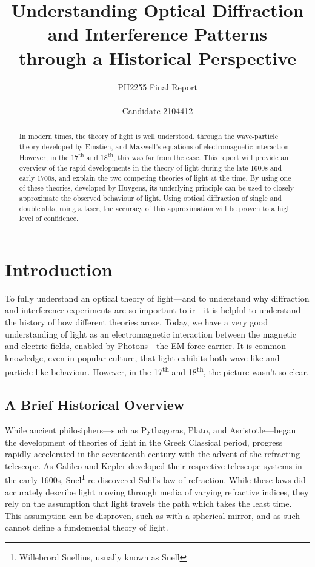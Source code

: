 \documentclass[a4paper]{article}
\title{%
  Understanding Optical Diffraction and Interference Patterns \\through a Historical Perspective}
\author{PH2255 Final Report\\ \\Candidate 2104412}
\begin{document}
\maketitle
\bigbreak
\bigbreak
{
\begin{changemargin}{1.5cm}{1.5cm} 
\begin{abstract}
{In modern times, the theory of light is well understood, through the wave-particle theory developed by Einstien, and Maxwell's equations of electromagnetic interaction. However, in the 17\textsuperscript{th} and 18\textsuperscript{th}, this was far from the case. This report will provide an overview of the rapid developments in the theory of light during the late 1600s and early 1700s, and explain the two competing theories of light at the time. By using one of these theories, developed by Huygens, its underlying principle can be used to closely approximate the observed behaviour of light. Using optical diffraction of single and double slits, using a laser, the accuracy of this approximation will be proven to a high level of confidence.}
\end{abstract}
\end{changemargin}
}
\tableofcontents
\clearpage
\section{Introduction} \label{sec:intro}
To fully understand an optical theory of light---and to understand why diffraction and interference experiments are so important to ir---it is helpful to understand the history of how different theories arose. Today, we have a very good understanding of light as an electromagnetic interaction between the magnetic and electric fields, enabled by Photons---the EM force carrier. It is common knowledge, even in popular culture, that light exhibits both wave-like and particle-like behaviour. However, in the 17\textsuperscript{th} and 18\textsuperscript{th}, the picture wasn't so clear.\cite[\S1.3]{RefWorks:doc:60689ea38f08cf86c9dc700e}

\subsection{A Brief Historical Overview} \label{sub:over}

While ancient philosiphers---such as Pythagoras, Plato, and Asristotle---began the development of theories of light in the Greek Classical period, progress rapidly accelerated in the seventeenth century with the advent of the refracting telescope. As Galileo and Kepler developed their respective telescope systems in the early 1600s, Snel\footnote{Willebrord Snellius, usually known as Snell} re-discovered Sahl's law of refraction. While these laws did accurately describe light moving through media of varying refractive indices, they rely on the assumption that light travels the path which takes the least time. This assumption can be disproven, such as with a spherical mirror, and as such cannot define a fundemental theory of light.
\end{document}
